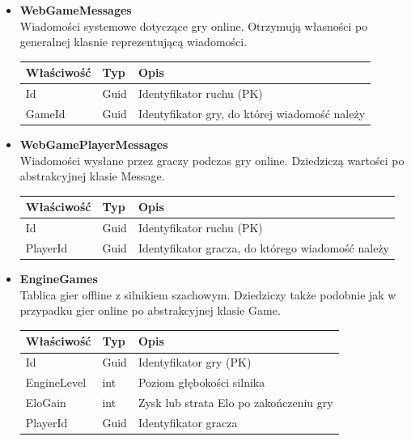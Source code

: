 \documentclass[twoside]{projektInzynierskiMS1}
\begin{document}
\begin{itemize}
    \item \textbf{WebGameMessages}\\
    Wiadomości systemowe dotyczące gry online. Otrzymują własności po generalnej klasnie reprezentującą wiadomości. 
    \renewcommand{\arraystretch}{1.2}
    \begin{longtable}{|m{4cm}|m{2cm}|m{8cm}|}
        \hline
        \rowcolor{lightgray}
        \textbf{Właściwość} & \textbf{Typ} & \textbf{Opis} \\ \hline
        \endhead
        \hline
        Id & Guid & Identyfikator ruchu (PK) \\ \hline
        GameId & Guid & Identyfikator gry, do której wiadomość należy \\ \hline
    \end{longtable}

    \item \textbf{WebGamePlayerMessages}\\
    Wiadomości wysłane przez graczy podczas gry online. Dziedziczą wartości po abstrakcyjnej klasie Message.
    \renewcommand{\arraystretch}{1.2}
    \begin{longtable}{|m{4cm}|m{2cm}|m{8cm}|}
        \hline
        \rowcolor{lightgray}
        \textbf{Właściwość} & \textbf{Typ} & \textbf{Opis} \\ \hline
        \endhead
        \hline
        Id & Guid & Identyfikator ruchu (PK) \\ \hline
        PlayerId & Guid & Identyfikator gracza, do którego wiadomość należy \\ \hline
    \end{longtable}
    
\newpage
    
    \item \textbf{EngineGames}\\
    Tablica gier offline z silnikiem szachowym. Dziedziczy także podobnie jak w przypadku gier online po abstrakcyjnej klasie Game.  
    \renewcommand{\arraystretch}{1.2}
    \begin{longtable}{|m{4cm}|m{2cm}|m{8cm}|}
        \hline
        \rowcolor{lightgray}
        \textbf{Właściwość} & \textbf{Typ} & \textbf{Opis} \\ \hline
        \endhead
        \hline
        Id & Guid & Identyfikator gry (PK) \\ \hline
        EngineLevel & int & Poziom głębokości silnika \\ \hline
        EloGain & int & Zysk lub strata Elo po zakończeniu gry \\ \hline
        PlayerId & Guid & Identyfikator gracza \\ \hline
    \end{longtable}
    

\end{itemize}
\end{document}
